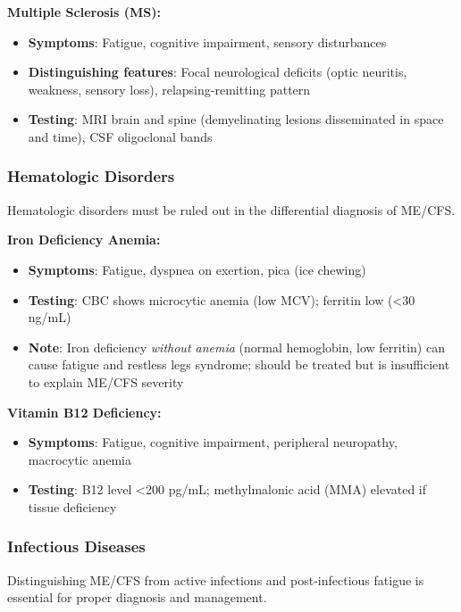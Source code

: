 \textbf{Multiple Sclerosis (MS):}
\begin{itemize}
    \item \textbf{Symptoms}: Fatigue, cognitive impairment, sensory disturbances
    \item \textbf{Distinguishing features}: Focal neurological deficits (optic neuritis, weakness, sensory loss), relapsing-remitting pattern
    \item \textbf{Testing}: MRI brain and spine (demyelinating lesions disseminated in space and time), CSF oligoclonal bands
\end{itemize}

\subsubsection{Hematologic Disorders}

\begin{requirement}
\label{req:anemia-exclusion}
Hematologic disorders must be ruled out in the differential diagnosis of ME/CFS.
\end{requirement}

\textbf{Iron Deficiency Anemia:}
\begin{itemize}
    \item \textbf{Symptoms}: Fatigue, dyspnea on exertion, pica (ice chewing)
    \item \textbf{Testing}: CBC shows microcytic anemia (low MCV); ferritin low (<30 ng/mL)
    \item \textbf{Note}: Iron deficiency \textit{without anemia} (normal hemoglobin, low ferritin) can cause fatigue and restless legs syndrome; should be treated but is insufficient to explain ME/CFS severity
\end{itemize}

\textbf{Vitamin B12 Deficiency:}
\begin{itemize}
    \item \textbf{Symptoms}: Fatigue, cognitive impairment, peripheral neuropathy, macrocytic anemia
    \item \textbf{Testing}: B12 level <200 pg/mL; methylmalonic acid (MMA) elevated if tissue deficiency
\end{itemize}

\subsubsection{Infectious Diseases}

\begin{observation}
\label{obs:infection-distinction}
Distinguishing ME/CFS from active infections and post-infectious fatigue is essential for proper diagnosis and management.
\end{observation}

